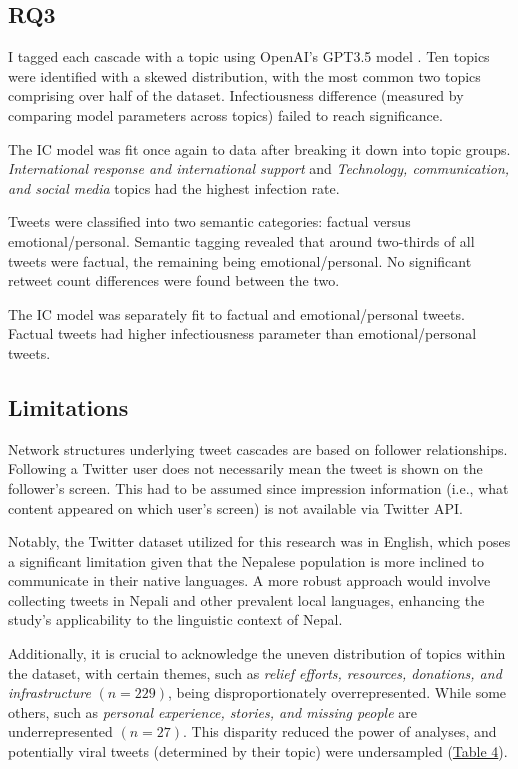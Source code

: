 \documentclass[11pt,a4paper]{article}
\begin{document}
    \subsection{RQ3}

    I tagged each cascade with a topic using OpenAI's GPT3.5 model \cite{openai_llc_openai_2023}. Ten topics were identified with a skewed distribution, with the most common two topics comprising over half of the dataset. Infectiousness difference (measured by comparing model parameters across topics) failed to reach significance.

The IC model was fit once again to data after breaking it down into topic groups. \textit{International response and international support} and \textit{Technology, communication, and social media} topics had the highest infection rate.
    
    Tweets were classified into two semantic categories: factual versus emotional/personal. Semantic tagging revealed that around two-thirds of all tweets were factual, the remaining being emotional/personal. No significant retweet count differences were found between the two.

The IC model was separately fit to factual and emotional/personal tweets. Factual tweets had higher infectiousness parameter than emotional/personal tweets.
    
    \subsection{Limitations}
    Network structures underlying tweet cascades are based on follower relationships. Following a Twitter user does not necessarily mean the tweet is shown on the follower’s screen. This had to be assumed since impression information (i.e., what content appeared on which user’s screen) is not available via Twitter API. 

    Notably, the Twitter dataset utilized for this research was in English, which poses a significant limitation given that the Nepalese population is more inclined to communicate in their native languages. A more robust approach would involve collecting tweets in Nepali and other prevalent local languages, enhancing the study's applicability to the linguistic context of Nepal.

    Additionally, it is crucial to acknowledge the uneven distribution of topics within the dataset, with certain themes, such as \textit{relief efforts, resources, donations, and infrastructure} $(n = 229)$, being disproportionately overrepresented. While some others, such as \textit{personal experience, stories, and missing people} are underrepresented $(n = 27)$. This disparity reduced the power of analyses, and potentially viral tweets (determined by their topic) were undersampled (\hyperlink{fig:topic-dist}{Table 4}).
    
\end{document}
